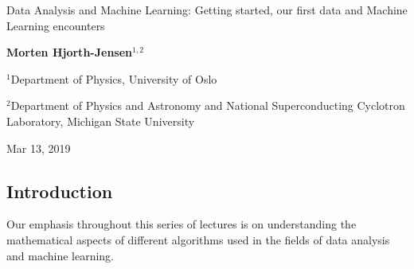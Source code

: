 \documentclass[%
oneside,                 %
final,                   %
10pt]{article}
\begin{document}

\newcommand{\exercisesection}[1]{\subsection*{#1}}






\thispagestyle{empty}

\begin{center}
{\LARGE\bf
\begin{spacing}{1.25}
Data Analysis and Machine Learning: Getting started, our first data and Machine Learning encounters
\end{spacing}
}
\end{center}


\begin{center}
{\bf Morten Hjorth-Jensen${}^{1, 2}$} \\ [0mm]
\end{center}

\begin{center}
\centerline{{\small ${}^1$Department of Physics, University of Oslo}}
\centerline{{\small ${}^2$Department of Physics and Astronomy and National Superconducting Cyclotron Laboratory, Michigan State University}}
\end{center}
    

\begin{center}
Mar 13, 2019
\end{center}

\vspace{1cm}


\subsection*{Introduction}

Our emphasis throughout this series of lectures  
is on understanding the mathematical aspects of
different algorithms used in the fields of data analysis and machine learning. 
\end{document}
